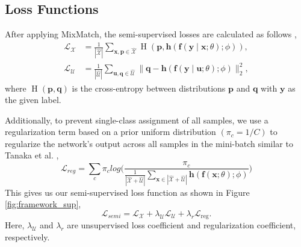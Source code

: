 \documentclass[10pt,twocolumn,letterpaper]{article}
\DeclareMathOperator{\xent}{H}
\begin{document}
\subsection{Loss Functions}
After applying MixMatch, the semi-supervised losses are calculated as follows \cite{berthelot2019mixmatch}, 
\begin{align}\label{eqn:l_combined}
\mathcal{L}_\mathcal{X} &= \frac{1}{|\hat{\mathcal{X}}|} \sum_{\mathbf{x}, \mathbf{p} \in \hat{\mathcal{X}}} \xent(\mathbf{p}, \mathbf{h}(\mathbf{f}(\mathbf{y} \mid \mathbf{x}; \theta);\phi)) , \\
    \mathcal{L}_\mathcal{U} &= \frac{1}{|\hat{\mathcal{U}}|} \sum_{\mathbf{u}, \mathbf{q} \in \hat{\mathcal{U}}} \|\mathbf{q} - \mathbf{h}(\mathbf{f}(\mathbf{y} \mid \mathbf{u}; \theta);\phi)\|_2^2, \label{eqn:l_u} 
\end{align}
where $\xent(\mathbf{p}, \mathbf{q})$ is the cross-entropy between distributions $\mathbf{p}$ and $\mathbf{q}$ with $\mathbf{y}$ as the given label.  

Additionally, to prevent single-class assignment of all samples, we use  a regularization term based on a prior uniform distribution $(\pi_c = 1/C)$ to regularize the network's output across all samples in the mini-batch similar to Tanaka et al. \cite{tanaka2018joint} ,
\begin{equation}
    \mathcal{L}_{reg} = \sum_c {\pi_c log\big( \frac{\pi_c}{\frac{1}{|\hat{\mathcal{X}}+\hat{\mathcal{U}}|} \sum_{\mathbf{x} \in |\hat{\mathcal{X}}+\hat{\mathcal{U}}|} \mathbf{h}(\mathbf{f}(\mathbf{x}; \theta); \phi)} \big)}
\end{equation}
This gives us our semi-supervised loss function as shown in Figure \ref{fig:framework_sup},
\begin{equation} \label{eq:combined_loss}
    \mathcal{L}_{semi}=\mathcal{L}_\mathcal{X}+ \lambda_\mathcal{U} \mathcal{L}_\mathcal{U} + \lambda_r \mathcal{L}_\mathrm{reg}.    
\end{equation}
Here, $\lambda_\mathcal{U}$ and $\lambda_r$ are unsupervised loss coefficient and regularization coefficient, respectively.
\end{document}
